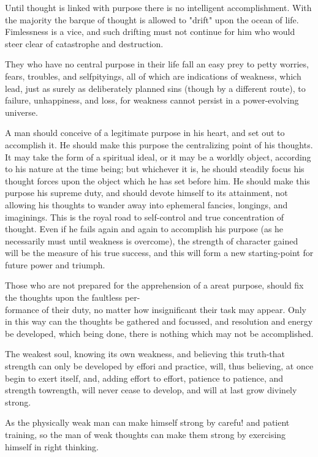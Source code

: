 \documentclass[10pt]{article}
\begin{document}
Until thought is linked with purpose there is no intelligent accomplishment. With the majority the barque of thought is allowed to "drift" upon the ocean of life. Fimlessness is a vice, and such drifting must not continue for him who would steer clear of catastrophe and destruction.

They who have no central purpose in their life fall an easy prey to petty worries, fears, troubles, and selfpityings, all of which are indications of weakness, which lead, just as surely as deliberately planned sins (though by a different route), to failure, unhappiness, and loss, for weakness cannot persist in a power-evolving universe.

A man should conceive of a legitimate purpose in his heart, and set out to accomplish it. He should make this purpose the centralizing point of his thoughts. It may take the form of a spiritual ideal, or it may be a worldly object, according to his nature at the time being; but whichever it is, he should steadily focus his thought forces upon the object which he has set before him. He should make this purpose his supreme duty, and should devote himself to its attainment, not allowing his thoughts to wander away into ephemeral fancies, longings, and imaginings. This is the royal road to self-control and true concentration of thought. Even if he fails again and again to accomplish his purpose (as he necessarily must until weakness is overcome), the strength of character gained will be the measure of his true success, and this will form a new starting-point for future power and triumph.

Those who are not prepared for the apprehension of a areat purpose, should fix the thoughts upon the faultless per-\\
formance of their duty, no matter how insignificant their task may appear. Only in this way can the thoughts be gathered and focussed, and resolution and energy be developed, which being done, there is nothing which may not be accomplished.

The weakest soul, knowing its own weakness, and believing this truth-that strength can only be developed by effori and practice, will, thus believing, at once begin to exert itself, and, adding effort to effort, patience to patience, and strength towrength, will never cease to develop, and will at last grow divinely strong.

As the physically weak man can make himself strong by carefu! and patient training, so the man of weak thoughts can make them strong by exercising himself in right thinking.
\end{document}
